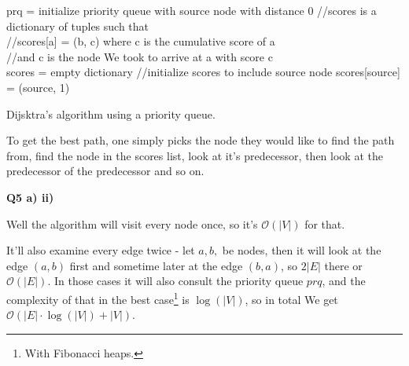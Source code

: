 \documentclass{article}
\begin{document}
	\begin{algorithm}[H]
		 prq = initialize priority queue with source node with distance 0\;
		 //scores is a dictionary of tuples such that \\
	 	//scores[a] = (b, c) where c is  the cumulative score of a\\
	 	//and c is the node We took to arrive at a with score c\\
		 scores = empty dictionary\;
		 //initialize scores to include source node
		 scores[source] = (source, 1)\;
		 \caption{Dijsktra's algorithm using a priority queue.}
	\end{algorithm}
	
	To get the best path, one simply picks the node they would like to find the path from, find the node in the scores list, look at it's predecessor, then look at the predecessor of the predecessor and so on.
	
\textbf{Q5 a) ii)}

	Well the algorithm will visit every node once, so it's $\mathcal{O}(|V|)$ for that. 
	
	It'll also examine every edge twice - let $a, b,$ be nodes, then it will look at the edge $(a, b)$ first and sometime later at the edge $(b, a)$, so $2|E|$ there or $\mathcal{O}(|E|)$. In those cases it will also consult the priority queue $prq$, and the complexity of that in the best case\footnote{With Fibonacci heaps.}  is $\log(|V|)$, so in total We get $\mathcal{O}(|E|\cdot\log(|V|) + |V|)$.
	
\end{document}
